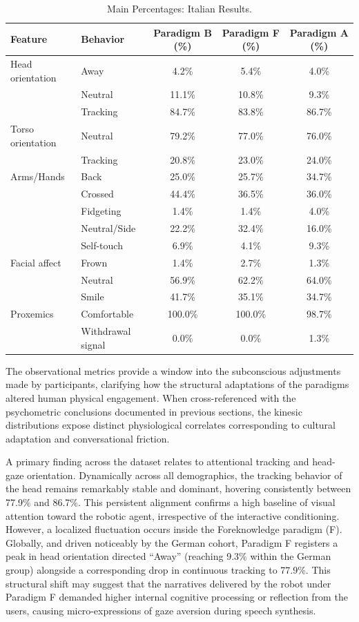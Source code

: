 \begin{table}[ht]
\centering
\begin{tabular}{llccc}
\toprule
Feature & Behavior & Paradigm B (\%) & Paradigm F (\%) & Paradigm A (\%) \\
\midrule
Head orientation & Away & 4.2\% & 5.4\% & 4.0\% \\
~ & Neutral & 11.1\% & 10.8\% & 9.3\% \\
~ & Tracking & 84.7\% & 83.8\% & 86.7\% \\
\midrule
Torso orientation & Neutral & 79.2\% & 77.0\% & 76.0\% \\
~ & Tracking & 20.8\% & 23.0\% & 24.0\% \\
\midrule
Arms/Hands & Back & 25.0\% & 25.7\% & 34.7\% \\
~ & Crossed & 44.4\% & 36.5\% & 36.0\% \\
~ & Fidgeting & 1.4\% & 1.4\% & 4.0\% \\
~ & Neutral/Side & 22.2\% & 32.4\% & 16.0\% \\
~ & Self-touch & 6.9\% & 4.1\% & 9.3\% \\
\midrule
Facial affect & Frown & 1.4\% & 2.7\% & 1.3\% \\
~ & Neutral & 56.9\% & 62.2\% & 64.0\% \\
~ & Smile & 41.7\% & 35.1\% & 34.7\% \\
\midrule
Proxemics & Comfortable & 100.0\% & 100.0\% & 98.7\% \\
~ & Withdrawal signal & 0.0\% & 0.0\% & 1.3\% \\
\bottomrule
\end{tabular}
\caption{Main Percentages: Italian Results.}
\label{tab:main_pct_italian}
\end{table}

The observational metrics provide a window into the subconscious adjustments made by participants, clarifying how the structural adaptations of the paradigms altered human physical engagement. When cross-referenced with the psychometric conclusions documented in previous sections, the kinesic distributions expose distinct physiological correlates corresponding to cultural adaptation and conversational friction.

A primary finding across the dataset relates to attentional tracking and head-gaze orientation. Dynamically across all demographics, the tracking behavior of the head remains remarkably stable and dominant, hovering consistently between 77.9\% and 86.7\%. 
This persistent alignment confirms a high baseline of visual attention toward the robotic agent, irrespective of the interactive conditioning. 
However, a localized fluctuation occurs inside the Foreknowledge paradigm (F). 
Globally, and driven noticeably by the German cohort, Paradigm F registers a peak in head orientation directed ``Away'' (reaching 9.3\% within the German group) alongside a corresponding drop in continuous tracking to 77.9\%. 
This structural shift may suggest that the narratives delivered by the robot under Paradigm F demanded higher internal cognitive processing or reflection from the users, causing micro-expressions of gaze aversion during speech synthesis.

